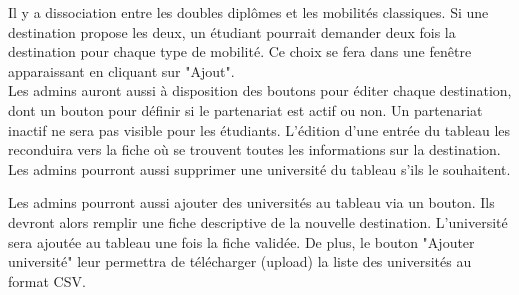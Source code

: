   Il y a dissociation entre les doubles diplômes et les mobilités classiques. Si une destination propose les deux, un étudiant pourrait demander deux fois la destination pour chaque type de mobilité. Ce choix se fera dans une fenêtre apparaissant en cliquant sur "Ajout". \\
 
 Les admins auront aussi à disposition des boutons pour éditer chaque destination, dont un bouton pour définir si le partenariat est actif ou non. Un partenariat inactif ne sera pas visible pour les étudiants.
 L'édition d'une entrée du tableau les reconduira vers la fiche où se trouvent toutes les informations sur la destination.
 Les admins pourront aussi supprimer une université du tableau s'ils le souhaitent.
 
 Les admins pourront aussi ajouter des universités au tableau via un bouton. Ils devront alors remplir une fiche descriptive de la nouvelle destination. L'université sera ajoutée au tableau une fois la fiche validée. De plus, le bouton "Ajouter université" leur permettra de télécharger (upload) la liste des universités au format CSV.
 
